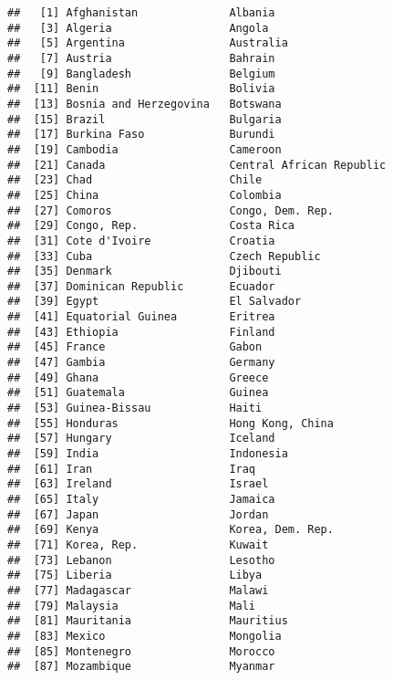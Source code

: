 \documentclass[]{article}
\begin{document}
\begin{verbatim}
##   [1] Afghanistan              Albania                 
##   [3] Algeria                  Angola                  
##   [5] Argentina                Australia               
##   [7] Austria                  Bahrain                 
##   [9] Bangladesh               Belgium                 
##  [11] Benin                    Bolivia                 
##  [13] Bosnia and Herzegovina   Botswana                
##  [15] Brazil                   Bulgaria                
##  [17] Burkina Faso             Burundi                 
##  [19] Cambodia                 Cameroon                
##  [21] Canada                   Central African Republic
##  [23] Chad                     Chile                   
##  [25] China                    Colombia                
##  [27] Comoros                  Congo, Dem. Rep.        
##  [29] Congo, Rep.              Costa Rica              
##  [31] Cote d'Ivoire            Croatia                 
##  [33] Cuba                     Czech Republic          
##  [35] Denmark                  Djibouti                
##  [37] Dominican Republic       Ecuador                 
##  [39] Egypt                    El Salvador             
##  [41] Equatorial Guinea        Eritrea                 
##  [43] Ethiopia                 Finland                 
##  [45] France                   Gabon                   
##  [47] Gambia                   Germany                 
##  [49] Ghana                    Greece                  
##  [51] Guatemala                Guinea                  
##  [53] Guinea-Bissau            Haiti                   
##  [55] Honduras                 Hong Kong, China        
##  [57] Hungary                  Iceland                 
##  [59] India                    Indonesia               
##  [61] Iran                     Iraq                    
##  [63] Ireland                  Israel                  
##  [65] Italy                    Jamaica                 
##  [67] Japan                    Jordan                  
##  [69] Kenya                    Korea, Dem. Rep.        
##  [71] Korea, Rep.              Kuwait                  
##  [73] Lebanon                  Lesotho                 
##  [75] Liberia                  Libya                   
##  [77] Madagascar               Malawi                  
##  [79] Malaysia                 Mali                    
##  [81] Mauritania               Mauritius               
##  [83] Mexico                   Mongolia                
##  [85] Montenegro               Morocco                 
##  [87] Mozambique               Myanmar                 

\end{verbatim}
\end{document}
